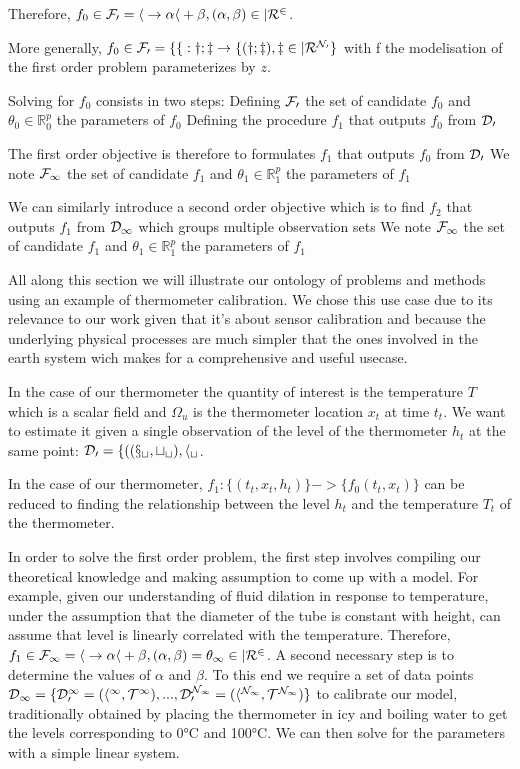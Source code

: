 \begin{bibunit}
{{{{  Therefore, $f_0 \in \cal{F}_0 = { h \to \alpha h + \beta , (\alpha, \beta) \in |R^2 }$.

  More generally, $f_0 \in \cal{F}_0 = \{ f: y; z \to f(y; z), z \in |R^{N_0} \}$ with f the modelisation of the first order problem parameterizes by $z$.

  
  Solving for $f_0$ consists in two steps: 
  Defining $\cal{F}_0$  the set of candidate $f_0$ and $\theta_0 \in \mathbb{R}^p_0$ the parameters of $f_0$
  Defining the procedure $f_1$ that outputs $f_0$ from $\cal{D}_0$
  

  The first order objective is therefore to formulates $f_1$ that outputs $f_0$ from $\cal{D}_0$
  We note $\cal{F}_1$  the set of candidate $f_1$ and $\theta_1 \in \mathbb{R}^p_1$ the parameters of $f_1$

  We can similarly introduce a second order objective which is to find $f_2$ that outputs $f_1$ from  $\cal{D}_1$ which groups multiple observation sets 
  We note $\cal{F}_1$  the set of candidate $f_1$ and $\theta_1 \in \mathbb{R}^p_1$ the parameters of $f_1$

All along this section we will illustrate our ontology of problems and methods using an example of thermometer calibration. We chose this use case due to its relevance to our work given that it's about sensor calibration and because the underlying physical processes are much simpler that the ones involved in the earth system wich makes for a comprehensive and useful usecase.

In the case of our thermometer the quantity of interest is the temperature  $T$ which is a scalar field and $\Omega_u$ is the thermometer location  $x_t$ at time $t_t$. 
  We want to estimate it given a single observation of the level of the thermometer $h_t$ at the same point: $\cal{D}_0 = \{((x_t, t_t), h_t$.

  In the case of our thermometer, $f_1: \{(t_t, x_t, h_t)\} -> \{f_0(t_t, x_t)\}$ can be reduced  to finding the relationship between the level $h_t$ and the temperature $T_t$ of the thermometer.


  In order to solve the first order problem, the first step involves compiling our theoretical knowledge and making assumption to come up with a model. For example, given our understanding of fluid dilation in response to temperature, under the assumption that the diameter of the tube is constant with height, can assume that level is linearly correlated with the temperature. Therefore, $f_1 \in \cal{F}_1 = { h \to \alpha h + \beta , (\alpha, \beta)=\theta_1 \in |R^2 }$.
    A second necessary step is to determine the values of $\alpha$ and $\beta$. To this end we require a set of data points $\cal{D}_1 = \{\cal{D}_0^1=(h^1, T^1), ..., \cal{D}_0^{N_1}=(h^{N_1}, T^{N_1})\}$ to calibrate our model, traditionally obtained by placing the thermometer in icy and boiling water to get the levels corresponding to 0°C and 100°C. We can then solve for the parameters with a simple linear system.




}}}}
\end{bibunit}
